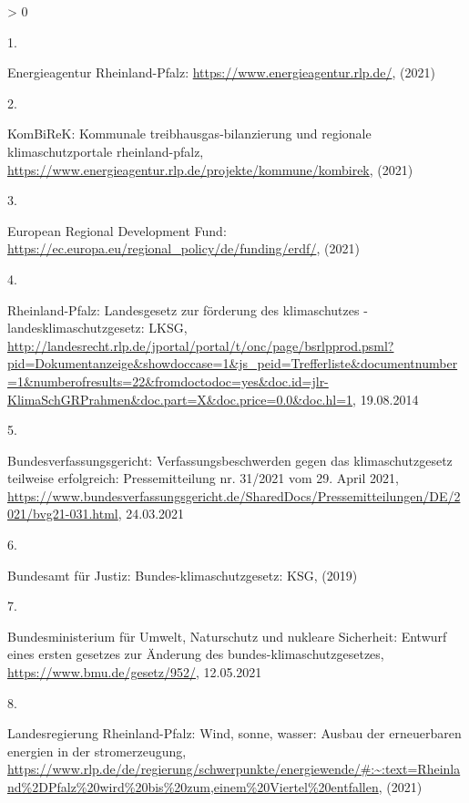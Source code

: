 \documentclass[a4paper,11pt]{article}
\newlength{\cslhangindent}
\newlength{\csllabelwidth}
\newenvironment{CSLReferences}[3] %
 {%
  \setlength{\parindent}{0pt}
  \ifodd #1 \everypar{\setlength{\hangindent}{\cslhangindent}}\ignorespaces\fi
  \ifnum #2 > 0
  \setlength{\parskip}{#2\baselineskip}
  \fi
 }%
 {}
\newcommand{\CSLLeftMargin}[1]{\parbox[t]{\maxof{\widthof{#1}}{\csllabelwidth}}{#1}}
\newcommand{\CSLRightInline}[1]{\parbox[t]{\linewidth}{#1}}
\begin{document}
\hypertarget{refs}{}
\begin{CSLReferences}{0}{0}
\leavevmode\hypertarget{ref-EnergieagenturRheinlandPfalz.2021}{}%
\CSLLeftMargin{1. }
\CSLRightInline{Energieagentur Rheinland-Pfalz: \url{https://www.energieagentur.rlp.de/}, (2021)}

\leavevmode\hypertarget{ref-KomBiReK.2021}{}%
\CSLLeftMargin{2. }
\CSLRightInline{KomBiReK: Kommunale treibhausgas-bilanzierung und regionale klimaschutzportale rheinland-pfalz, \url{https://www.energieagentur.rlp.de/projekte/kommune/kombirek}, (2021)}

\leavevmode\hypertarget{ref-EuropeanRegionalDevelopmentFund.2021}{}%
\CSLLeftMargin{3. }
\CSLRightInline{European Regional Development Fund: \url{https://ec.europa.eu/regional_policy/de/funding/erdf/}, (2021)}

\leavevmode\hypertarget{ref-RheinlandPfalz.19.08.2014}{}%
\CSLLeftMargin{4. }
\CSLRightInline{Rheinland-Pfalz: Landesgesetz zur f{ö}rderung des klimaschutzes - landesklimaschutzgesetz: LKSG, \url{http://landesrecht.rlp.de/jportal/portal/t/onc/page/bsrlpprod.psml?pid=Dokumentanzeige\&showdoccase=1\&js_peid=Trefferliste\&documentnumber=1\&numberofresults=22\&fromdoctodoc=yes\&doc.id=jlr-KlimaSchGRPrahmen\&doc.part=X\&doc.price=0.0\&doc.hl=1}, 19.08.2014}

\leavevmode\hypertarget{ref-Bundesverfassungsgericht.24.03.2021}{}%
\CSLLeftMargin{5. }
\CSLRightInline{Bundesverfassungsgericht: Verfassungsbeschwerden gegen das klimaschutzgesetz teilweise erfolgreich: Pressemitteilung nr. 31/2021 vom 29. April 2021, \url{https://www.bundesverfassungsgericht.de/SharedDocs/Pressemitteilungen/DE/2021/bvg21-031.html}, 24.03.2021}

\leavevmode\hypertarget{ref-BundesamtfurJustiz.2019}{}%
\CSLLeftMargin{6. }
\CSLRightInline{Bundesamt für Justiz: Bundes-klimaschutzgesetz: KSG, (2019)}

\leavevmode\hypertarget{ref-BundesministeriumfurUmweltNaturschutzundnukleareSicherheit.12.05.2021}{}%
\CSLLeftMargin{7. }
\CSLRightInline{Bundesministerium für Umwelt, Naturschutz und nukleare Sicherheit: Entwurf eines ersten gesetzes zur {Ä}nderung des bundes-klimaschutzgesetzes, \url{https://www.bmu.de/gesetz/952/}, 12.05.2021}

\leavevmode\hypertarget{ref-LandesregierungRheinlandPfalz.2021}{}%
\CSLLeftMargin{8. }
\CSLRightInline{Landesregierung Rheinland-Pfalz: Wind, sonne, wasser: Ausbau der erneuerbaren energien in der stromerzeugung, \url{https://www.rlp.de/de/regierung/schwerpunkte/energiewende/\#:~:text=Rheinland\%2DPfalz\%20wird\%20bis\%20zum,einem\%20Viertel\%20entfallen}, (2021)}


\end{CSLReferences}
\end{document}

